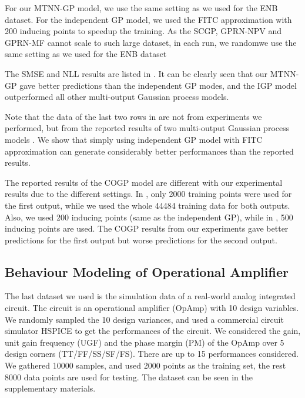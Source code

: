 For our MTNN-GP model, we use the same setting as we used for the ENB dataset. For the independent GP model, we used the FITC approximation with 200 inducing points to speedup the training. As the SCGP, GPRN-NPV and GPRN-MF cannot scale to such large dataset, in each run, we randomwe use the same setting as we used for the ENB dataset

The SMSE and NLL results are listed in . It can be clearly seen that our MTNN-GP gave better predictions than the independent GP modes, and the IGP model outperformed all other multi-output Gaussian process models. 

Note that the data of the last two rows in  are not from experiments we performed, but from the reported results of two multi-output Gaussian process models \cite{nguyen2014collaborative, NIPS2015_5665}. We show that simply using independent GP model with FITC approximation can generate considerably better performances than the reported results.

The reported results of the COGP model are different with our experimental results due to the different settings. In \cite{nguyen2014collaborative}, only 2000 training points were used for the first output, while we used the whole 44484 training data for both outputs. Also, we used 200 inducing points (same as the independent GP), while in \cite{nguyen2014collaborative}, 500 inducing points are used. The COGP results from our experiments gave better predictions for the first output but worse predictions for the second output.


\subsection{Behaviour Modeling of Operational Amplifier}\label{sec:dac14}


The last dataset we used is the simulation data of a real-world analog integrated circuit. The circuit is an operational amplifier (OpAmp) with 10 design variables. We randomly sampled the 10 design variances, and used a commercial circuit simulator HSPICE to get the performances of the circuit. We considered the gain, unit gain frequency (UGF) and the phase margin (PM) of the OpAmp over 5 design corners (TT/FF/SS/SF/FS). There are up to 15 performances considered. We gathered 10000 samples, and used 2000 points as the training set, the rest 8000 data points are used for testing. The dataset can be seen in the supplementary materials.


